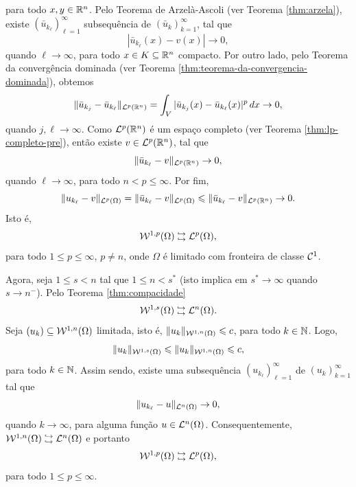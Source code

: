para todo $x,y \in \mathbb{R}^n$.
Pelo Teorema de Arzelà-Ascoli (ver Teorema \ref{thm:arzela}), existe $(\bar u_{k_\ell})_{\ell=1}^\infty$ subsequência de $(\bar u_k)_{k=1}^\infty$, tal que
\[
    |\bar u_{k_\ell}(x) - v(x)| \to 0,
\]
quando $\ell \to \infty$, para todo $x \in K \subseteq \mathbb{R}^n$ compacto.
Por outro lado, pelo Teorema da convergência dominada (ver Teorema \ref{thm:teorema-da-convergencia-dominada}), obtemos
\[
    \Vert \bar u_{k_j} - \bar u_{k_\ell} \Vert_{\mathcal{L}^p(\mathbb{R}^n)} = \int_{V} |\bar u_{k_j}(x) - \bar u_{k_\ell}(x)|^p \,dx \to 0,
\]
quando $j,\ell \to \infty$.
Como $\mathcal{L}^p(\mathbb{R}^n)$ é um espaço completo (ver Teorema \ref{thm:lp-completo-pre}), então existe $v \in \mathcal{L}^p(\mathbb{R}^n)$, tal que
\[
    \Vert \bar u_{k_\ell} - v \Vert_{\mathcal{L}^p(\mathbb{R}^n)} \to 0,
\]
quando $\ell \to \infty$, para todo $n < p \leqslant \infty$.
Por fim,
\[
    \Vert u_{k_\ell} - v \Vert_{\mathcal{L}^p(\Omega)} = \Vert \bar u_{k_\ell} - v \Vert_{\mathcal{L}^p(\Omega)} \leqslant \Vert \bar u_{k_\ell} - v \Vert_{\mathcal{L}^p(\mathbb{R}^n)} \to 0.
\]
Isto é,
\[
    \mathcal{W}^{1,p}(\Omega) \;\substack{\hookrightarrow \\ \hookrightarrow}\; \mathcal{L}^p(\Omega),
\]
para todo $1 \leqslant p \leqslant \infty$, $p \neq n$, onde $\Omega$ é limitado com fronteira de classe $\mathcal{C}^1$.

Agora, seja $1 \leqslant s < n$ tal que $1 \leqslant n < s^*$ (isto implica em $s^* \to \infty$ quando $s \to n^-$).
Pelo Teorema \ref{thm:compacidade}
\[
    \mathcal{W}^{1,s}(\Omega) \;\substack{\hookrightarrow \\ \hookrightarrow}\; \mathcal{L}^n(\Omega).
\]
Seja $(u_k) \subseteq \mathcal{W}^{1,n}(\Omega)$ limitada, isto é, $\Vert u_k \Vert_{\mathcal{W}^{1,n}(\Omega)} \leqslant c$, para todo $k \in \mathbb{N}$.
Logo,
\[
    \Vert u_k \Vert_{\mathcal{W}^{1,s}(\Omega)} \leqslant \Vert u_k \Vert_{\mathcal{W}^{1,n}(\Omega)} \leqslant c,
\]
para todo $k \in \mathbb{N}$.
Assim sendo, existe uma subsequência $(u_{k_\ell})_{\ell=1}^\infty$ de $(u_k)_{k=1}^\infty$ tal que
\[
    \Vert u_{k_\ell} - u \Vert_{\mathcal{L}^n(\Omega)} \to 0,
\]
quando $k \to \infty$, para alguma função $u \in \mathcal{L}^n(\Omega)$.
Consequentemente, $\mathcal{W}^{1,n}(\Omega) \;\substack{\hookrightarrow \\ \hookrightarrow}\; \mathcal{L}^n(\Omega)$ e portanto
\[
    \mathcal{W}^{1,p}(\Omega) \;\substack{\hookrightarrow \\ \hookrightarrow}\; \mathcal{L}^p(\Omega),
\]
para todo $1 \leqslant p \leqslant \infty$.
